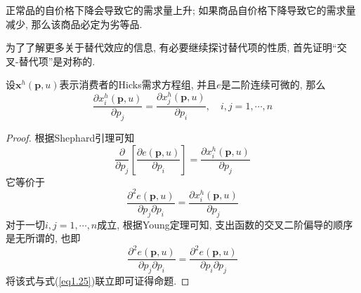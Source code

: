 \documentclass[cn, 12pt, math=mtpro2, bibstyle=apa, blue, twocol]{elegantbook}
\newcommand{\p}{\mathbf{p}}
\newcommand{\x}{\mathbf{x}}
\begin{document}
\begin{corollary}
正常品的自价格下降会导致它的需求量上升; 如果商品自价格下降导致它的需求量减少, 那么该商品必定为劣等品.
\end{corollary}

为了了解更多关于替代效应的信息, 有必要继续探讨替代项的性质, 首先证明“交叉-替代项”是对称的.

\begin{proposition}\label{pro:pro1.3}
设$\x^h(\p,u)$表示消费者的Hicks需求方程组, 并且$e$是二阶连续可微的, 那么
$$\frac{\partial x_i^h(\p,u)}{\partial p_j}=\frac{\partial x_j^h(\p,u)}{\partial p_i},\quad i,j=1,\cdots,n$$
\end{proposition}
\begin{proof}
  根据Shephard引理可知
  $$\frac{\partial}{\partial p_j}\left[\frac{\partial e(\p,u)}{\partial p_i}\right]=\frac{\partial x_i^h(\p,u)}{\partial p_j}$$
  它等价于
  \begin{equation}\label{eq1.25}
    \frac{\partial^2e(\p,u)}{\partial p_j\partial p_i}=\frac{\partial x_i^h(\p,u)}{\partial p_j}
  \end{equation}
  对于一切$i,j=1,\cdots,n$成立, 根据Young定理可知, 支出函数的交叉二阶偏导的顺序是无所谓的, 也即
  $$\frac{\partial^2e(\p,u)}{\partial p_j\partial p_i}=\frac{\partial^2e(\p,u)}{\partial p_i\partial p_j}$$
  将该式与式(\ref{eq1.25})联立即可证得命题.
\end{proof}
\end{document}

